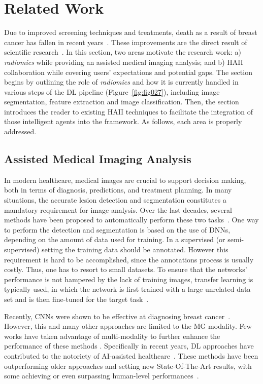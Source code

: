 \section{Related Work}
\label{sec:chap005002}

Due to improved screening techniques and treatments, death as a result of breast cancer has fallen in recent years~\cite{doi:10.3322/caac.21492, doi:10.1002/cncr.32859}.
These improvements are the direct result of scientific research~\cite{AGRAWAL201927, murtaza2019deep}.
In this section, two areas motivate the research work: a) {\it radiomics} while providing an assisted medical imaging analysis; and b) \ac{HAII} collaboration while covering users' expectations and potential gaps.
The section begins by outlining the role of {\it radiomics} and how it is currently handled in various steps of the \ac{DL} pipeline (Figure~\ref{fig:fig027}), including image segmentation, feature extraction and image classification.
Then, the section introduces the reader to existing \ac{HAII} techniques to facilitate the integration of those intelligent agents into the framework.
As follows, each area is properly addressed.

\subsection{Assisted Medical Imaging Analysis}
\label{sec:chap005002001}

In modern healthcare, medical images are crucial to support decision making, both in terms of diagnosis, predictions, and treatment planning.
In many situations, the accurate lesion detection and segmentation constitutes a mandatory requirement for image analysis. 
Over the last decades, several methods have been proposed to automatically perform these two tasks~\cite{litjens2017survey}.
One way to perform the detection and segmentation is based on the use of \acp{DNN}, depending on the amount of data used for training.
In a supervised (or semi-supervised) setting the training data should be annotated. However this requirement is hard to be accomplished, since the annotations process is usually costly. Thus,  one has to resort to small datasets.
To ensure that the networks' performance is not hampered by the lack of training images, transfer learning is typically used, in which the network is first trained with a large unrelated data set and is then fine-tuned for the target task~\cite{shin2016deep}.

Recently, \acp{CNN} were shown to be effective at diagnosing breast cancer~\cite{carneiro2017automated}.
However, this and many other approaches \cite{wang2016discrimination, becker2017deep, khan2019novel} are limited to the \ac{MG} modality.
Few works have taken advantage of multi-modality to further enhance the performance of these methods \cite{murtaza2019deep}.
Specifically in recent years, \ac{DL} approaches have contributed to the notoriety of \ac{AI}-assisted healthcare~\cite{topol2019high}.
These methods have been outperforming older approaches and setting  new State-Of-The-Art results, with some achieving or even surpassing human-level performances~\cite{esteva2017dermatologist, gale2017detecting}.


